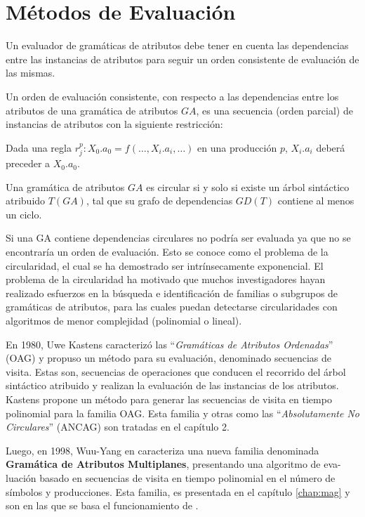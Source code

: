 \section{Métodos de Evaluación}
\label{sec:met_eval}
Un evaluador de gramáticas de atributos debe tener en cuenta las dependencias entre las instancias de atributos para seguir un orden consistente de evaluación de las mismas.

\begin{definition} Un orden de evaluación consistente, con respecto a las dependencias entre los atributos de una gramática de atributos $GA$, es una secuencia (orden parcial) de instancias de atributos con la siguiente restricción:

Dada una regla $r_{j}^{p} : X_{0}.a_{0} = f(\ldots, X_{i}.a_{i}, \ldots)$ en una producción $p$, 
$X_{i}.a_{i}$ deberá preceder a $X_{0}.a_{0}$.
\end{definition}

\begin{definition} 
Una gramática de atributos $GA$ es circular si y solo si existe un árbol sintáctico atribuido $T(GA)$, tal que su grafo de dependencias $GD(T)$ contiene al menos un ciclo.
\end{definition}

Si una GA contiene dependencias circulares no podría ser evaluada ya que no se encontraría un orden de evaluación. Esto se conoce como el problema de la circularidad, el cual se ha demostrado ser intrínsecamente exponencial\cite{intri-exc}. El problema de la circularidad ha motivado que muchos investigadores hayan realizado esfuerzos en la búsqueda e identificación de familias o subgrupos de gramáticas de atributos, para las cuales puedan detectarse circularidades con algoritmos de menor complejidad (polinomial o lineal).

En 1980, Uwe Kastens\cite{kastens} caracterizó las ``\textit{Gramáticas de Atributos Ordenadas}'' (OAG) y propuso un método para su evaluación, denominado secuencias de visita. Estas son, secuencias de operaciones que conducen el recorrido del árbol sintáctico atribuido y realizan la evaluación de las instancias de los atributos. Kastens propone un método para generar las secuencias de visita en tiempo polinomial para la familia OAG. Esta familia y otras como las ``\textit{Absolutamente No Circulares}'' (ANCAG) son tratadas en el capítulo 2.

Luego, en 1998, Wuu-Yang en \cite{wuu-yang1} caracteriza una nueva familia denominada \textbf{Gramática de Atributos Multiplanes}, presentando una algoritmo de eva-luación basado en secuencias de visita en tiempo polinomial en el número de símbolos y producciones. Esta familia, es presentada en el capítulo \ref{chap:mag} y son en las que se basa el funcionamiento de \maggen.  

